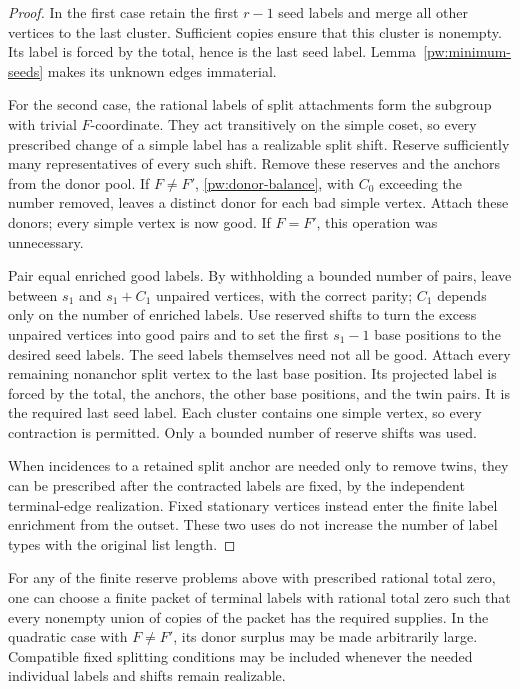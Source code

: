 \begin{proof}
In the first case retain the first $r-1$ seed labels and merge all other
vertices to the last cluster.  Sufficient copies ensure that this cluster
is nonempty.  Its label is forced by the total, hence is the last seed
label.  Lemma~\ref{pw:minimum-seeds} makes its unknown edges immaterial.

For the second case, the rational labels of split attachments form the
subgroup with trivial $F$-coordinate.  They act transitively on the simple
coset, so every prescribed change of a simple label has a realizable split
shift.  Reserve sufficiently many representatives of every such shift.
Remove these reserves and the anchors from the donor pool.  If $F\ne F'$,
\eqref{pw:donor-balance}, with $C_0$ exceeding the number removed, leaves a
distinct donor for each bad simple vertex.  Attach these donors; every
simple vertex is now good.  If $F=F'$, this operation was unnecessary.

Pair equal enriched good labels.  By withholding a bounded number of pairs,
leave between $s_1$ and $s_1+C_1$ unpaired vertices, with the correct parity;
$C_1$ depends only on the number of enriched labels.  Use reserved shifts
to turn the excess unpaired vertices into good pairs and to set the first
$s_1-1$ base positions to the desired seed labels.  The seed labels
themselves need not all be good.  Attach every remaining nonanchor split
vertex to the last base position.  Its projected label is forced by the
total, the anchors, the other base positions, and the twin pairs.  It is
the required last seed label.  Each cluster contains one simple vertex,
so every contraction is permitted.  Only a bounded number of reserve
shifts was used.

When incidences to a retained split anchor are needed only to remove twins,
they can be prescribed after the contracted labels are fixed, by the
independent terminal-edge realization.  Fixed stationary vertices instead
enter the finite label enrichment from the outset.  These two uses do not
increase the number of label types with the original list length.
\end{proof}

\begin{lemma}\label{pw:packets}
For any of the finite reserve problems above with prescribed rational total
zero, one can choose a finite packet of terminal labels with rational total
zero such that every nonempty union of copies of the packet has the required
supplies. In the quadratic case with $F\ne F'$, its donor surplus may
be made arbitrarily large. Compatible fixed splitting conditions may be
included whenever
the needed individual labels and shifts remain realizable.
\end{lemma}

